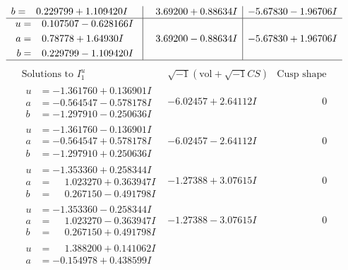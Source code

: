 \documentclass[1p]{elsarticle_modified}
\theoremstyle{definition}
\newcommand{\I}{\sqrt{-1}}
\begin{document}
$$\begin{array}{c|c|c}
\begin{aligned}
b &= \phantom{-}0.229799 + 1.109420 I\end{aligned}
 & \phantom{-}3.69200 + 0.88634 I & -5.67830 - 1.96706 I \\ \hline\begin{aligned}
u &= \phantom{-}0.107507 - 0.628166 I \\
a &= \phantom{-}0.78778 + 1.64930 I \\
b &= \phantom{-}0.229799 - 1.109420 I\end{aligned}
 & \phantom{-}3.69200 - 0.88634 I & -5.67830 + 1.96706 I\\
 \hline 
 \end{array}$$\newpage$$\begin{array}{c|c|c}  
\text{Solutions to }I^u_{1}& \I (\text{vol} + \sqrt{-1}CS) & \text{Cusp shape}\\
 \hline 
\begin{aligned}
u &= -1.361760 + 0.136901 I \\
a &= -0.564547 - 0.578178 I \\
b &= -1.297910 - 0.250636 I\end{aligned}
 & -6.02457 + 2.64112 I & \phantom{-0.000000 } 0 \\ \hline\begin{aligned}
u &= -1.361760 - 0.136901 I \\
a &= -0.564547 + 0.578178 I \\
b &= -1.297910 + 0.250636 I\end{aligned}
 & -6.02457 - 2.64112 I & \phantom{-0.000000 } 0 \\ \hline\begin{aligned}
u &= -1.353360 + 0.258344 I \\
a &= \phantom{-}1.023270 + 0.363947 I \\
b &= \phantom{-}0.267150 - 0.491798 I\end{aligned}
 & -1.27388 + 3.07615 I & \phantom{-0.000000 } 0 \\ \hline\begin{aligned}
u &= -1.353360 - 0.258344 I \\
a &= \phantom{-}1.023270 - 0.363947 I \\
b &= \phantom{-}0.267150 + 0.491798 I\end{aligned}
 & -1.27388 - 3.07615 I & \phantom{-0.000000 } 0 \\ \hline\begin{aligned}
u &= \phantom{-}1.388200 + 0.141062 I \\
a &= -0.154978 + 0.438599 I \\

\end{aligned}
\end{array}$$
\end{document}
